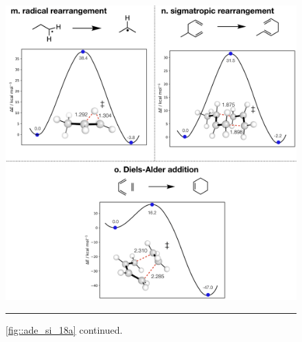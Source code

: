 \documentclass[../../main.tex]{subfiles}
\begin{document}
\begin{figure}[h!]
	\vspace{0.4cm}
	\centering
	\includegraphics[width=\textwidth]{5/autode/figs/figS18m-o}
	\vspace{0.2cm}
	\hrule
	\caption{\figurename{ \ref{fig::ade_si_18a}} continued.}
	\label{fig::ade_si_18m}
\end{figure}
\end{document}
